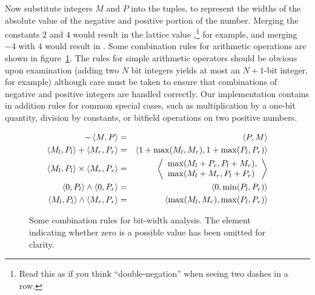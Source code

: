 \documentclass{acmconf}
\begin{document}
Now substitute integers $M$ and $P$ into the tuples, to represent the
widths of the absolute value of the negative and positive portion of
the number.  Merging the constants $2$ and $4$ would result in the lattice
value ,\footnote{Read this as  if you think
  ``double-negation'' when seeing two dashes in a row.}
for example, and merging $-4$ with $4$ would result in
.  Some combination rules for arithmetic operations are
shown in figure~\ref{fig:bitrules}.  The rules for simple arithmetic
operators should be obvious upon examination (adding two $N$ bit
integers yields at most an $N+1$-bit integer, for example) although
care must be taken to ensure that combinations of negative and
positive integers are handled correctly.  Our implementation contains
in addition rules for common special cases, such as multiplication by
a one-bit quantity, division by constants, or bitfield operations on
two positive numbers.
\begin{figure}
\begin{eqnarray*}
-\left\langle M,P \right\rangle &=& \left\langle P,M \right\rangle\\
\left\langle M_l,P_l \right\rangle + \left\langle M_r,P_r \right\rangle &=& \left\langle 1+\max(M_l,M_r),1+\max(P_l,P_r) \right\rangle\\
\left\langle M_l,P_l \right\rangle \times \left\langle M_r,P_r \right\rangle &=&
\left\langle \begin{array}{l}\max(M_l+P_r,P_l+M_r),\\
                       \max(M_l+M_r,P_l+P_r)\end{array} \right\rangle\\
\left\langle 0,P_l \right\rangle \wedge \left\langle 0,P_r \right\rangle &=& \left\langle 0,\min(P_l,P_r) \right\rangle\\
\left\langle M_l,P_l \right\rangle\wedge \left\langle M_r,P_r \right\rangle &=& \left\langle \max(M_l,M_r),\max(P_l,P_r) \right\rangle
\end{eqnarray*}%
\caption{Some combination rules for bit-width analysis.  The 
  element indicating whether zero is a possible value has been omitted
  for clarity.}\label{fig:bitrules}
\end{figure}
\end{document}
